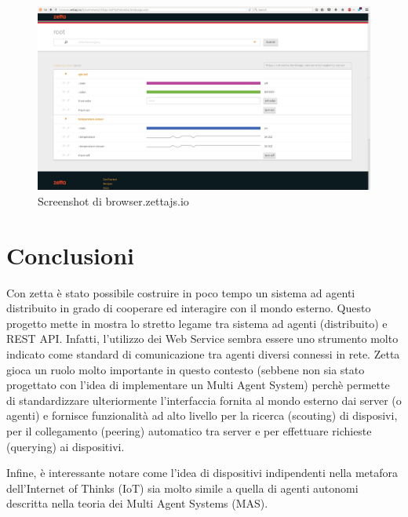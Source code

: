 \documentclass[]{scrartcl}
\begin{document}
\begin{figure}[h]
\centering
\includegraphics[scale=0.18]{browser-zetta-screen.png}
\caption{Screenshot di browser.zettajs.io}
\label{fig:browser-zetta}
\end{figure}

\section{Conclusioni}
Con zetta è stato possibile costruire in poco tempo un sistema ad agenti distribuito in grado di cooperare ed interagire con il mondo esterno. Questo progetto mette in mostra lo stretto legame tra sistema ad agenti (distribuito) e REST API. Infatti, l'utilizzo dei Web Service sembra essere uno strumento molto indicato come standard di comunicazione tra agenti diversi connessi in rete. Zetta gioca un ruolo molto importante in questo contesto (sebbene non sia stato progettato con l'idea di implementare un Multi Agent System) perchè permette di standardizzare ulteriormente l'interfaccia fornita al mondo esterno dai server (o agenti) e fornisce funzionalità ad alto livello per la ricerca (scouting) di disposivi, per il collegamento (peering) automatico tra server e per effettuare richieste (querying) ai dispositivi. 

Infine, è interessante notare come l'idea di dispositivi indipendenti nella metafora dell'Internet of Thinks (IoT) sia molto simile a quella di agenti autonomi descritta nella teoria dei Multi Agent Systems (MAS). 
\end{document}

